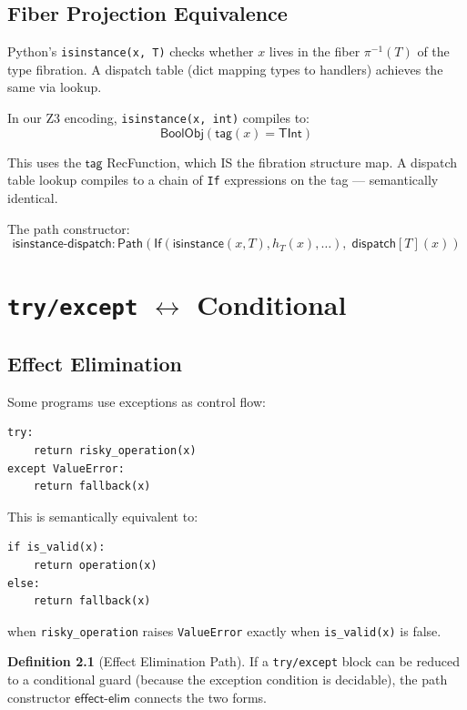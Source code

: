 \documentclass[11pt,a4paper]{report}
\theoremstyle{definition}
\newtheorem{definition}{Definition}[chapter]
\theoremstyle{plain}
\newcommand{\Path}{\mathsf{Path}}
\begin{document}
\section{Fiber Projection Equivalence}

Python's \texttt{isinstance(x, T)} checks whether $x$ lives in the
fiber $\pi^{-1}(T)$ of the type fibration.  A dispatch table (dict
mapping types to handlers) achieves the same via lookup.

In our Z3 encoding, \texttt{isinstance(x, int)} compiles to:
\[
  \mathsf{BoolObj}(\mathsf{tag}(x) = \mathsf{TInt})
\]

This uses the $\mathsf{tag}$ RecFunction, which IS the fibration
structure map.  A dispatch table lookup compiles to a chain of
\texttt{If} expressions on the tag --- semantically identical.

The path constructor:
\[
  \mathsf{isinstance\text{-}dispatch} : \Path(
    \mathsf{If}(\mathsf{isinstance}(x, T), h_T(x), \ldots),\;
    \mathsf{dispatch}[T](x))
\]


\chapter{\texttt{try/except} $\leftrightarrow$ Conditional}
\label{ch:try-cond}

\section{Effect Elimination}

Some programs use exceptions as control flow:
\begin{lstlisting}
try:
    return risky_operation(x)
except ValueError:
    return fallback(x)
\end{lstlisting}

This is semantically equivalent to:
\begin{lstlisting}
if is_valid(x):
    return operation(x)
else:
    return fallback(x)
\end{lstlisting}

when \texttt{risky\_operation} raises \texttt{ValueError} exactly when
\texttt{is\_valid(x)} is false.

\begin{definition}[Effect Elimination Path]
If a \texttt{try/except} block can be reduced to a conditional guard
(because the exception condition is decidable), the path constructor
$\mathsf{effect\text{-}elim}$ connects the two forms.
\end{definition}
\end{document}
